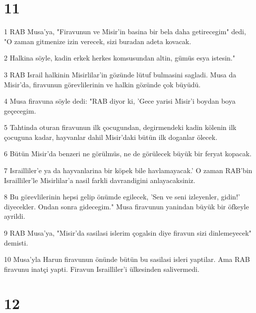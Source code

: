\chapter{11}

\par 1 RAB Musa'ya, "Firavunun ve Misir'in basina bir bela daha getirecegim" dedi, "O zaman gitmenize izin verecek, sizi buradan adeta kovacak.
\par 2 Halkina söyle, kadin erkek herkes komsusundan altin, gümüs esya istesin."
\par 3 RAB Israil halkinin Misirlilar'in gözünde lütuf bulmasini sagladi. Musa da Misir'da, firavunun görevlilerinin ve halkin gözünde çok büyüdü.
\par 4 Musa firavuna söyle dedi: "RAB diyor ki, 'Gece yarisi Misir'i boydan boya geçecegim.
\par 5 Tahtinda oturan firavunun ilk çocugundan, degirmendeki kadin kölenin ilk çocuguna kadar, hayvanlar dahil Misir'daki bütün ilk doganlar ölecek.
\par 6 Bütün Misir'da benzeri ne görülmüs, ne de görülecek büyük bir feryat kopacak.
\par 7 Israilliler'e ya da hayvanlarina bir köpek bile havlamayacak.' O zaman RAB'bin Israilliler'le Misirlilar'a nasil farkli davrandigini anlayacaksiniz.
\par 8 Bu görevlilerinin hepsi gelip önümde egilecek, 'Sen ve seni izleyenler, gidin!' diyecekler. Ondan sonra gidecegim." Musa firavunun yanindan büyük bir öfkeyle ayrildi.
\par 9 RAB Musa'ya, "Misir'da sasilasi islerim çogalsin diye firavun sizi dinlemeyecek" demisti.
\par 10 Musa'yla Harun firavunun önünde bütün bu sasilasi isleri yaptilar. Ama RAB firavunu inatçi yapti. Firavun Israilliler'i ülkesinden salivermedi.

\chapter{12}

